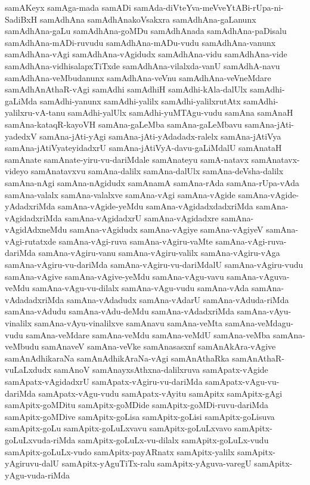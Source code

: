 {samAKeyx
samAga-mada
samADi
samAda-diVteYva-meVveYtABi-rUpa-ni-SadiBxH
samAdhAna
samAdhAnakoVsakxra
samAdhAna-gaLanunx
samAdhAna-gaLu
samAdhAna-goMDu
samAdhAnada
samAdhAna-paDisalu
samAdhAna-mADi-ruvudu
samAdhAna-mADu-vudu
samAdhAna-vanunx
samAdhAna-vAgi
samAdhAna-vAgidudx
samAdhAna-vidu
samAdhAna-vide
samAdhAna-vidhisalapxTiTxde
samAdhAna-vilalxda-vanU
samAdhA-navu
samAdhAna-veMbudanunx
samAdhAna-veVnu
samAdhAna-veVneMdare
samAdhAnAthaR-vAgi
samAdhi
samAdhiH
samAdhi-kAla-dalUlx
samAdhi-gaLiMda
samAdhi-yanunx
samAdhi-yalilx
samAdhi-yalilxrutAtx
samAdhi-yalilxru-vA-tanu
samAdhi-yalUlx
samAdhi-yuMTAgu-vudu
samAna
samAnaH
samAna-kataqR-kayoVH
samAna-gaLeMba
samAna-gaLeMbavu
samAna-jAti-yadedxV
samAna-jAti-yAgi
samAna-jAti-yAdadadx-ralelx
samAna-jAtiVya
samAna-jAtiVyateyidadxrU
samAna-jAtiVyA-davu-gaLiMdalU
samAnataH
samAnate
samAnate-yiru-vu-dariMdale
samAnateyu
samA-natavx
samAnatavx-videyo
samAnatavxvu
samAna-dalilx
samAna-dalUlx
samAna-deVsha-dalilx
samAna-nAgi
samAna-nAgidudx
samAnamA
samAna-rAda
samAna-rUpa-vAda
samAna-valalx
samAna-valalxve
samAna-vAgi
samAna-vAgide
samAna-vAgide-yAdadxriMda
samAna-vAgide-yeMdu
samAna-vAgidadxdadxriMda
samAna-vAgidadxriMda
samAna-vAgidadxrU
samAna-vAgidadxre
samAna-vAgidAdxneMdu
samAna-vAgidudx
samAna-vAgiye
samAna-vAgiyeV
samAna-vAgi-rutatxde
samAna-vAgi-ruva
samAna-vAgiru-vaMte
samAna-vAgi-ruva-dariMda
samAna-vAgiru-vanu
samAna-vAgiru-valilx
samAna-vAgiru-vAga
samAna-vAgiru-vu-dariMda
samAna-vAgiru-vu-dariMdalU
samAna-vAgiru-vudu
samAna-vAgive
samAna-vAgive-yeMdu
samAna-vAgu-vavu
samAna-vAguva-veMdu
samAna-vAgu-vu-dilalx
samAna-vAgu-vudu
samAna-vAda
samAna-vAdadadxriMda
samAna-vAdadudx
samAna-vAdarU
samAna-vAduda-riMda
samAna-vAdudu
samAna-vAdu-deMdu
samAna-vAdadxriMda
samAna-vAyu-vinalilx
samAna-vAyu-vinalilxve
samAnavu
samAna-veMta
samAna-veMdagu-vudu
samAna-veMdare
samAna-veMdu
samAna-veMdU
samAna-veMba
samAna-veMbudu
samAnaveV
samAna-veVke
samAnasasxnf
samAnAkAra-vAgive
samAnAdhikaraNa
samAnAdhikAraNa-vAgi
samAnAthaRka
samAnAthaR-vuLaLxdudx
samAnoV
samAnayxsAthxna-dalilxruva
samApatx-vAgide
samApatx-vAgidadxrU
samApatx-vAgiru-vu-dariMda
samApatx-vAgu-vu-dariMda
samApatx-vAgu-vudu
samApatx-vAyitu
samApitx
samApitx-gAgi
samApitx-goMDitu
samApitx-goMDide
samApitx-goMDi-ruvu-dariMda
samApitx-goMDive
samApitx-goLisa
samApitx-goLisi
samApitx-goLisuva
samApitx-goLu
samApitx-goLuLxvavu
samApitx-goLuLxvavo
samApitx-goLuLxvuda-riMda
samApitx-goLuLx-vu-dilalx
samApitx-goLuLx-vudu
samApitx-goLuLx-vudo
samApitx-payARnatx
samApitx-yalilx
samApitx-yAgiruvu-dalU
samApitx-yAguTiTx-ralu
samApitx-yAguva-varegU
samApitx-yAgu-vuda-riMda
}
